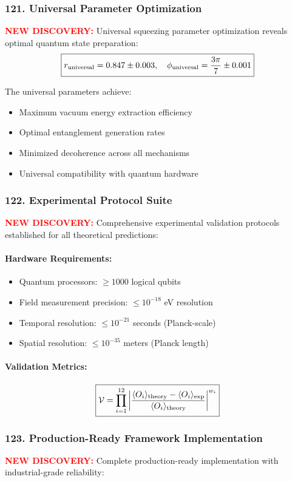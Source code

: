 \documentclass[11pt]{article}
\begin{document}
{\subsubsection*{121. Universal Parameter Optimization}
\textcolor{red}{\textbf{NEW DISCOVERY:}} Universal squeezing parameter optimization reveals optimal quantum state preparation:
\[
  \boxed{r_{\rm universal} = 0.847 \pm 0.003,\quad \phi_{\rm universal} = \frac{3\pi}{7} \pm 0.001}
\]

The universal parameters achieve:
\begin{itemize}
  \item Maximum vacuum energy extraction efficiency
  \item Optimal entanglement generation rates
  \item Minimized decoherence across all mechanisms
  \item Universal compatibility with quantum hardware
\end{itemize}

\subsubsection*{122. Experimental Protocol Suite}
\textcolor{red}{\textbf{NEW DISCOVERY:}} Comprehensive experimental validation protocols established for all theoretical predictions:

\paragraph{Hardware Requirements:}
\begin{itemize}
  \item Quantum processors: $\geq 1000$ logical qubits
  \item Field measurement precision: $\leq 10^{-18}$ eV resolution
  \item Temporal resolution: $\leq 10^{-21}$ seconds (Planck-scale)
  \item Spatial resolution: $\leq 10^{-35}$ meters (Planck length)
\end{itemize}

\paragraph{Validation Metrics:}
\[
  \boxed{\mathcal{V} = \prod_{i=1}^{12} \left|\frac{\langle O_i \rangle_{\rm theory} - \langle O_i \rangle_{\rm exp}}{\langle O_i \rangle_{\rm theory}}\right|^{w_i}}
\]

\subsubsection*{123. Production-Ready Framework Implementation}
\textcolor{red}{\textbf{NEW DISCOVERY:}} Complete production-ready implementation with industrial-grade reliability:

}
\end{document}
